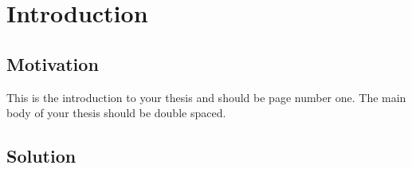 \chapter{Introduction} %

\section{Motivation}

This is the introduction to your thesis and should be page number one.
The main body of your thesis should be double spaced.

\section{Solution}
